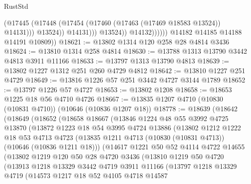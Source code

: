 \begin{lexlean}{RustStd}
\begin{coremodule}
                                (@17445
                                  (@17448 (@17454 (@17460 (@17463 (@17469 @18583 @13524)) @14131)))
                                  @13524))
                              @14131)))
                        @13524))
                    @14132))))))
        @14182
        @14185
        @14188
        @14191
        @10809))
@18621 := @13802 @1314 @120 @258 @28 @4814 @3436
@18624 := @13810 @1314 @258 @4814
@18630 := @13788 @1313 @13790 @3442 @4813 @3911 @11166
@18633 := @13797 @1313 @13790 @4813
@18639 := @13802 @1227 @1312 @251 @260 @4729 @4812
@18642 := @13810 @1227 @251 @4729
@18649 := @13816 @1226 @57 @251 @3442 @4727 @3144 @1789
@18652 := @13797 @1226 @57 @4727
@18653 := @13802 @1208
@18658 := @18653 @1225 @18 @56 @4710 @4726
@18667 := @13835 @1207 @4710 (@10830 (@10831 @4710)) (@10646 (@10836 @1207 @18))
@18778 := @18639
    (@18642
      (@18649
        (@18652
          (@18658
            @18667
            (@13846
              @1224
              @48
              @55
              @3992
              @4725
              @13870
              (@13872
                @1223
                @18
                @54
                @3995
                @4724
                @13886
                (@13802
                  @1212
                  @1222
                  @18
                  @53
                  @4713
                  @4723
                  (@13835 @1211 @4713 (@10830 (@10831 @4713)) (@10646 (@10836 @1211 @18)))
                  (@14617
                    @1221
                    @50
                    @52
                    @4114
                    @4722
                    @14655
                    (@13802
                      @1219
                      @120
                      @50
                      @28
                      @4720
                      @3436
                      (@13810
                        @1219
                        @50
                        @4720
                        (@13913
                          @1218
                          @13329
                          @3442
                          @4719
                          @3911
                          @11166
                          (@13797
                            @1218
                            @13329
                            @4719
                            (@14573
                              @1217
                              @18
                              @52
                              @4105
                              @4718
                              @14587

\end{coremodule}
\end{lexlean}

